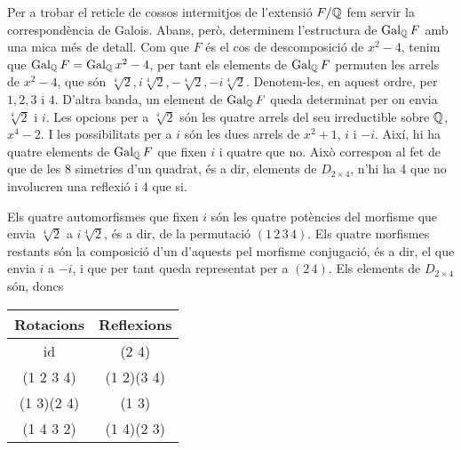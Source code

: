 \documentclass[12pt]{article}
\begin{document}
\parbreak

Per a trobar el reticle de cossos intermitjos de l'extensió \( F/\mathbb{Q} \) fem servir la
correspondència de Galois. Abans, però, determinem l'estructura de \( \operatorname{Gal_{\mathbb{Q}}}{F} \) amb una
mica més de detall. Com que \( F \) és el cos de descomposició de \( x^2 - 4 \), tenim que
\( \operatorname{Gal_{\mathbb{Q}}}{F} = \operatorname{Gal_{\mathbb{Q}}}{x^2 - 4} \), per tant els elements de \( \operatorname{Gal_{\mathbb{Q}}}{F} \) permuten les
arrels de \( x^2 - 4 \), que són \( \sqrt[4]{2}, i\sqrt[4]{2}, -\sqrt[4]{2}, -i\sqrt[4]{2}
\). Denotem-les, en aquest ordre, per \( 1, 2, 3 \) i \( 4 \). D'altra banda, un element
de \( \operatorname{Gal_{\mathbb{Q}}}{F} \) queda determinat per on envia \( \sqrt[4]{2} \) i \( i \). Les opcions
per a \( \sqrt[4]{2} \) són les quatre arrels del seu irreductible sobre \( \mathbb{Q} \), \( x^4
- 2 \). I les possibilitats per a \( i \) són les dues arrels de \( x^2 + 1 \), \( i \) i
\( -i \). Així, hi ha quatre elements de \( \operatorname{Gal_{\mathbb{Q}}}{F} \) que fixen \( i \) i quatre que no.
Això correspon al fet de que de les 8 simetries d'un quadrat, és a dir, elements de \(
D_{2 \times 4} \), n'hi ha 4 que no involucren una reflexió i 4 que si. 

Els quatre automorfismes que fixen \( i \) són les quatre potències del morfisme que envia
\( \sqrt[4]{2} \) a \( i\sqrt[4]{2} \), és a dir, de la permutació \( (1 \, 2 \, 3 \, 4)
\). Els quatre morfismes restants són la composició d'un d'aquests pel morfisme
conjugació, és a dir, el que envia \( i \) a \( -i \), i que per tant queda representat
per a \( (2\,4) \). Els elements de \( D_{2 \times 4} \) són, doncs
\begin{table}[h]
	\center
	\begin{tabular}{cc}
		\toprule
		Rotacions & Reflexions \\
		\midrule
		id & (2 4) \\
		(1 2 3 4) & (1 2)(3 4) \\
		(1 3)(2 4) & (1 3) \\
		(1 4 3 2) & (1 4)(2 3) \\
		\bottomrule
	\end{tabular}
\end{table}
\end{document}
